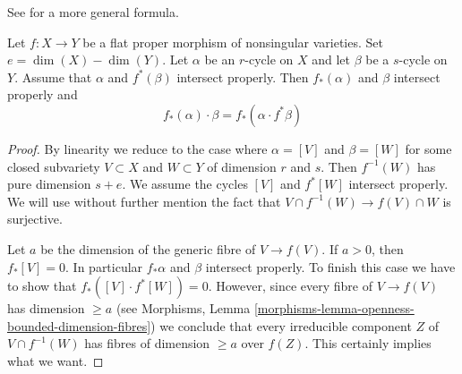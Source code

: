 \begin{lemma}
\label{lemma-projection-formula-flat}
\begin{reference}
See \cite[Chapter V, C), Section 7, formula (10)]{Serre_algebre_locale}
for a more general formula.
\end{reference}
Let $f : X \to Y$ be a flat proper morphism of nonsingular varieties.
Set $e = \dim(X) - \dim(Y)$. Let $\alpha$ be an $r$-cycle on $X$ and let
$\beta$ be a $s$-cycle on $Y$. Assume that $\alpha$ and $f^*(\beta)$ intersect
properly. Then $f_*(\alpha)$ and $\beta$ intersect properly and
$$
f_*(\alpha) \cdot \beta = f_*( \alpha \cdot f^*\beta)
$$
\end{lemma}

\begin{proof}
By linearity we reduce to the case where $\alpha = [V]$ and
$\beta = [W]$ for some closed subvariety $V \subset X$ and
$W \subset Y$ of dimension $r$ and $s$. Then $f^{-1}(W)$ has
pure dimension $s + e$. We assume the cycles
$[V]$ and $f^*[W]$ intersect properly. We will use without
further mention the fact that $V \cap f^{-1}(W) \to f(V) \cap W$
is surjective.

\medskip\noindent
Let $a$ be the dimension of the generic fibre of $V \to f(V)$.
If $a > 0$, then $f_*[V] = 0$. In particular $f_*\alpha$ and $\beta$
intersect properly. To finish this case we have to show that
$f_*([V] \cdot f^*[W]) = 0$. However, since every fibre of
$V \to f(V)$ has dimension $\geq a$ (see
Morphisms, Lemma \ref{morphisms-lemma-openness-bounded-dimension-fibres})
we conclude that every irreducible component $Z$ of $V \cap f^{-1}(W)$
has fibres of dimension $\geq a$ over $f(Z)$. This certainly
implies what we want.


\end{proof}
